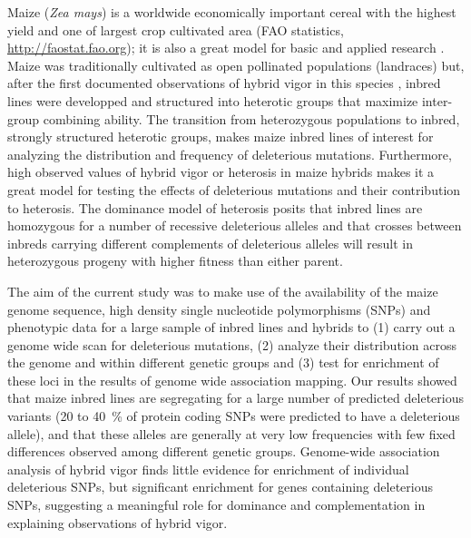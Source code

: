 \documentclass[12pt]{article}
\begin{document}
Maize (\emph{Zea mays}) is a worldwide economically important cereal with the highest yield and one of largest crop cultivated area (FAO statistics, \url{http://faostat.fao.org}); it is also a great model for basic and applied research \citep{Strable2009}. Maize was traditionally cultivated as open pollinated populations (landraces) but, after the first documented observations of hybrid vigor in this species \citep{East1908,Shull1908}, inbred lines were developped and structured into heterotic groups that maximize inter-group combining ability. 
The transition from heterozygous populations to inbred, strongly structured heterotic groups, makes maize inbred lines of interest for analyzing the distribution and frequency of deleterious mutations. Furthermore, high observed values of hybrid vigor or heterosis in maize hybrids makes it a great model for testing the effects of deleterious mutations and their contribution to heterosis.  The dominance model of heterosis posits that inbred lines are homozygous for a number of recessive deleterious alleles and that crosses between inbreds carrying different complements of deleterious alleles will result in heterozygous progeny with higher fitness than either parent.

The aim of the current study was to make use of the availability of the maize genome sequence, high density single nucleotide polymorphisms (SNPs) and phenotypic data for a large sample of inbred lines and hybrids to (1) carry out a genome wide scan for deleterious mutations, (2) analyze their distribution across the genome and within different genetic groups and (3) test for enrichment of these loci in the results of genome wide association mapping. Our results showed that maize inbred lines are segregating for a large number of predicted deleterious variants (20 to 40 \,\% of protein coding SNPs were predicted to have a deleterious allele), and that these alleles are generally at very low frequencies with few fixed differences observed among different genetic groups. Genome-wide association analysis of hybrid vigor finds little evidence for enrichment of individual deleterious SNPs, but significant enrichment for genes containing deleterious SNPs, suggesting a meaningful role for dominance and complementation in explaining observations of hybrid vigor. 
\end{document}
